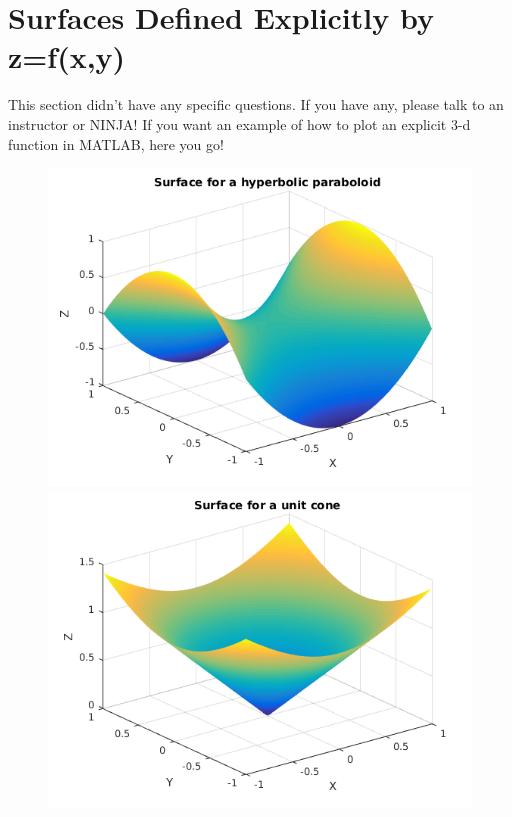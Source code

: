 \documentclass{article}
\begin{document}

\section{Surfaces Defined Explicitly by z=f(x,y)}

This section didn't have any specific questions. If you have any, please talk to an instructor or NINJA! If you want an example of how to plot an explicit 3-d function in MATLAB, here you go!



\begin{figure} [h!]
    \centering
        \begin{minipage}{0.3\textwidth}
            \centering
            \includegraphics[width=\linewidth]{figs_and_code/hyp_parab_3d.png}
        \end{minipage}\hfill
        \begin{minipage}{0.3\textwidth}
            \centering
            \includegraphics[width=\linewidth]{figs_and_code/cone_3d.png}

\end{minipage}
\end{figure}
\end{document}

